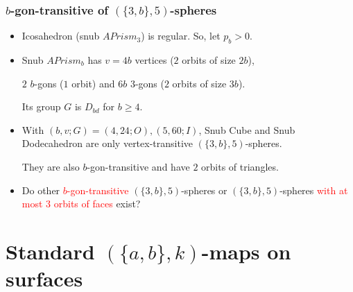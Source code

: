 \documentclass{beamer}
\begin{document}
\begin{frame}\frametitle{$b$-gon-transitive  of  $(\{3,b\},5)$-spheres}
\begin{itemize}
\item Icosahedron (snub $APrism_3$) is regular. So, let $p_b>0$.
\item Snub $APrism_b$ has $v=4b$ vertices ($2$ orbits of size $2b$), 

$2$ 
$b$-gons ($1$ 
orbit) and $6b$ $3$-gons ($2$ orbits of size $3b$). 

Its group $G$ is 
$D_{bd}$ 
for $b\ge 4$.
\item With $(b,v;G)=(4,24;O), (5,60;I)$, Snub Cube and Snub Dodecahedron 
are only vertex-transitive  
$(\{3,b\},5)$-spheres.

They are also $b$-gon-transitive and have $2$ orbits of triangles.
\item Do other 
\textcolor{red}{$b$-gon-transitive} $(\{3,b\},5)$-spheres or 
$(\{3,b\},5)$-spheres \textcolor{red}{with at 
most $3$ orbits of faces} exist?
 \end{itemize}
\end{frame}



\section{Standard $(\{a,b\},k)$-maps on 
surfaces}

 
\end{document}
